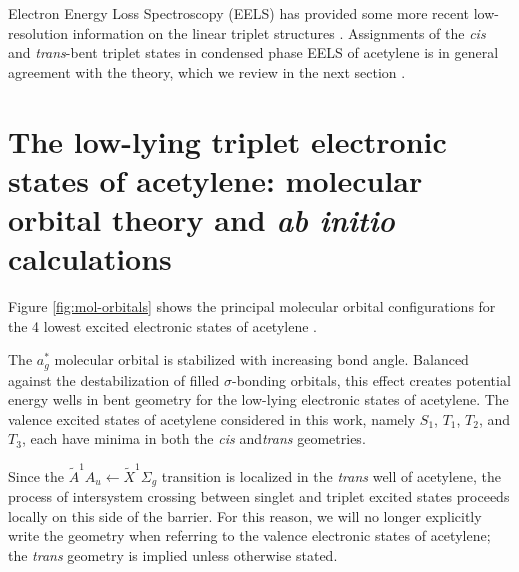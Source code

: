 \documentclass[12pt]{mitthesis}
\begin{document}
Electron Energy Loss Spectroscopy (EELS) has provided some more recent
low-resolution information on the linear triplet structures
\cite{dressler87, swiderek97}.  Assignments of the \emph{cis} and
\emph{trans}-bent triplet states in condensed phase EELS of acetylene
is in general agreement with the theory, which we review in the next
section \cite{malsch98}.


\section{The low-lying triplet electronic states of acetylene:
  molecular orbital theory and \emph{ab initio} calculations}

Figure \ref{fig:mol-orbitals} shows the principal molecular orbital
configurations for the 4 lowest excited electronic states of
acetylene \cite{yamaguchi93}.

  The
$a_g^*$ molecular orbital is stabilized with increasing  bond
angle.  Balanced against the destabilization of filled
$\sigma$-bonding orbitals, this effect creates potential energy wells
in bent geometry for the low-lying electronic states of acetylene.
The valence excited states of acetylene considered in this work,
namely $S_1$, $T_1$, $T_2$, and $T_3$, each have minima in both the
\emph{cis} and\emph{trans} geometries.

  Since the
$\tilde{A}^1A_u \leftarrow \tilde{X}^1\Sigma_g$ transition is
localized in the \emph{trans} well of acetylene, the process of
intersystem crossing between singlet and triplet excited states
proceeds locally on this side of the barrier.  For this reason, we
will no longer explicitly write the geometry when referring to the
valence electronic states of acetylene; the \emph{trans} geometry is
implied unless otherwise stated.
\end{document}
